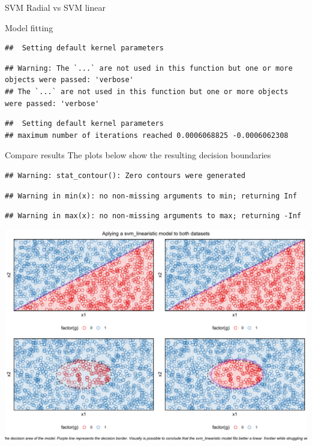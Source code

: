 \documentclass[
  ignorenonframetext,
]{article}
\begin{document}
\begin{frame}[fragile]{SVM Radial vs SVM linear}
\begin{block}{Model fitting}
\begin{verbatim}
##  Setting default kernel parameters
\end{verbatim}

\begin{verbatim}
## Warning: The `...` are not used in this function but one or more objects were passed: 'verbose'
## The `...` are not used in this function but one or more objects were passed: 'verbose'
\end{verbatim}

\begin{verbatim}
##  Setting default kernel parameters  
## maximum number of iterations reached 0.0006068825 -0.0006062308
\end{verbatim}
\end{block}

\begin{block}{Compare results}
\protect\hypertarget{compare-results-4}{}
The plots below show the resulting decision boundaries

\begin{verbatim}
## Warning: stat_contour(): Zero contours were generated
\end{verbatim}

\begin{verbatim}
## Warning in min(x): no non-missing arguments to min; returning Inf
\end{verbatim}

\begin{verbatim}
## Warning in max(x): no non-missing arguments to max; returning -Inf
\end{verbatim}

\begin{center}\includegraphics{_main_files/figure-beamer/unnamed-chunk-70-1} \end{center}


\end{block}
\end{frame}
\end{document}
